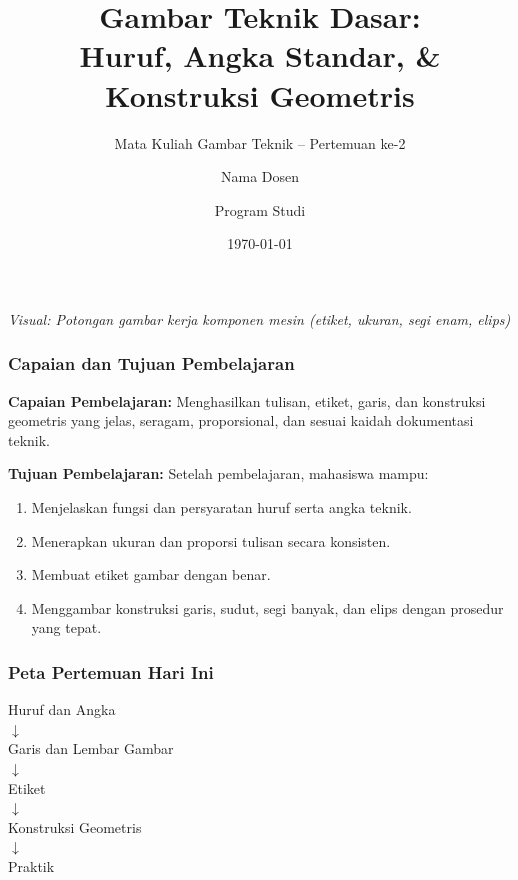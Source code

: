 \documentclass[../gbr_teknik.tex]{subfiles}
\title{Gambar Teknik Dasar: \\ Huruf, Angka Standar, \& Konstruksi Geometris}
\subtitle{Mata Kuliah Gambar Teknik -- Pertemuan ke-2}
\author{Nama Dosen \and Program Studi}
\date{\today}
\begin{document}
\begin{frame}[mytitle=center, mycolor=digiPH_ocean, dark]
	\titlepage
	\vspace{-1em}
	\begin{center}
		\footnotesize \textit{Visual: Potongan gambar kerja komponen mesin (etiket, ukuran, segi enam, elips)}
	\end{center}
\end{frame}

\begin{frame}[mytitle=standard]
	\frametitle{Capaian dan Tujuan Pembelajaran}

	\textbf{Capaian Pembelajaran:}
	Menghasilkan tulisan, etiket, garis, dan konstruksi geometris yang jelas, seragam, proporsional, dan sesuai kaidah dokumentasi teknik.

	\vspace{1em}
	\textbf{Tujuan Pembelajaran:}
	Setelah pembelajaran, mahasiswa mampu:
	\begin{enumerate}
		\item Menjelaskan fungsi dan persyaratan huruf serta angka teknik.
		\item Menerapkan ukuran dan proporsi tulisan secara konsisten.
		\item Membuat etiket gambar dengan benar.
		\item Menggambar konstruksi garis, sudut, segi banyak, dan elips dengan prosedur yang tepat.
	\end{enumerate}
\end{frame}

\begin{frame}[mytitle=center, mycolor=digiPH_gray, light]
	\frametitle{Peta Pertemuan Hari Ini}
	\begin{center}
		\Large
		Huruf dan Angka \\
		$\downarrow$ \\
		Garis dan Lembar Gambar \\
		$\downarrow$ \\
		Etiket \\
		$\downarrow$ \\
		Konstruksi Geometris \\
		$\downarrow$ \\
		Praktik
	\end{center}
\end{frame}
\end{document}
